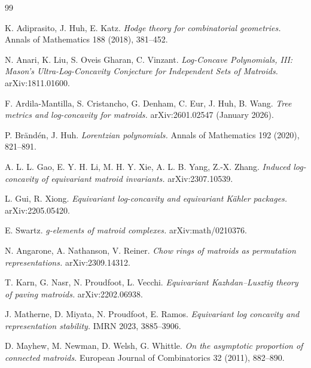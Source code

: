 \documentclass[11pt]{article}
\theoremstyle{definition}
\begin{document}
\begin{thebibliography}{99}

 K. Adiprasito, J. Huh, E. Katz. \emph{Hodge theory for combinatorial geometries.} Annals of Mathematics 188 (2018), 381--452.

 N. Anari, K. Liu, S. Oveis Gharan, C. Vinzant. \emph{Log-Concave Polynomials, III: Mason's Ultra-Log-Concavity Conjecture for Independent Sets of Matroids.} arXiv:1811.01600.

 F. Ardila-Mantilla, S. Cristancho, G. Denham, C. Eur, J. Huh, B. Wang. \emph{Tree metrics and log-concavity for matroids.} arXiv:2601.02547 (January 2026).

 P. Br\"and\'en, J. Huh. \emph{Lorentzian polynomials.} Annals of Mathematics 192 (2020), 821--891.

 A. L. L. Gao, E. Y. H. Li, M. H. Y. Xie, A. L. B. Yang, Z.-X. Zhang. \emph{Induced log-concavity of equivariant matroid invariants.} arXiv:2307.10539.

 L. Gui, R. Xiong. \emph{Equivariant log-concavity and equivariant K\"ahler packages.} arXiv:2205.05420.

 E. Swartz. \emph{g-elements of matroid complexes.} arXiv:math/0210376.

 N. Angarone, A. Nathanson, V. Reiner. \emph{Chow rings of matroids as permutation representations.} arXiv:2309.14312.

 T. Karn, G. Nasr, N. Proudfoot, L. Vecchi. \emph{Equivariant Kazhdan--Lusztig theory of paving matroids.} arXiv:2202.06938.

 J. Matherne, D. Miyata, N. Proudfoot, E. Ramos. \emph{Equivariant log concavity and representation stability.} IMRN 2023, 3885--3906.

 D. Mayhew, M. Newman, D. Welsh, G. Whittle. \emph{On the asymptotic proportion of connected matroids.} European Journal of Combinatorics 32 (2011), 882--890.

\end{thebibliography}
\end{document}
